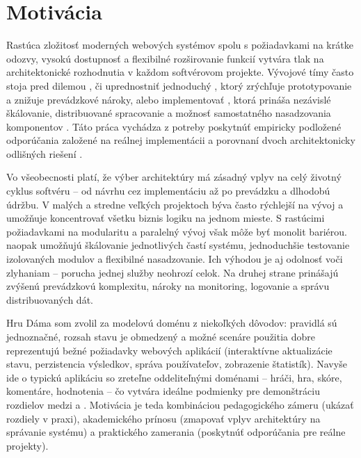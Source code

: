 \chapter{Motivácia}\label{ch:motivation}

Rastúca zložitosť moderných webových systémov spolu s požiadavkami na krátke odozvy, vysokú dostupnosť a flexibilné rozširovanie funkcií vytvára tlak na architektonické rozhodnutia v každom softvérovom projekte. Vývojové tímy často stoja pred dilemou \cite{Newman2021,Richardson2018}, či uprednostniť jednoduchý , ktorý zrýchľuje prototypovanie a znižuje prevádzkové nároky, alebo implementovať , ktorá prináša nezávislé škálovanie, distribuované spracovanie a možnosť samostatného nasadzovania komponentov \cite{FowlerMicroservices}. Táto práca vychádza z potreby poskytnúť empiricky podložené odporúčania založené na reálnej implementácii a porovnaní dvoch architektonicky odlišných riešení \cite{FowlerMonolithFirst}.

Vo všeobecnosti platí, že výber architektúry má zásadný vplyv na celý životný cyklus softvéru – od návrhu cez implementáciu až po prevádzku a dlhodobú údržbu. V malých a stredne veľkých projektoch býva  často rýchlejší na vývoj a umožňuje koncentrovať všetku biznis logiku na jednom mieste. S rastúcimi požiadavkami na modularitu a paralelný vývoj však môže byť monolit bariérou.  naopak umožňujú škálovanie jednotlivých častí systému, jednoduchšie testovanie izolovaných modulov a flexibilné nasadzovanie. Ich výhodou je aj odolnosť voči zlyhaniam – porucha jednej služby neohrozí celok. Na druhej strane prinášajú zvýšenú prevádzkovú komplexitu, nároky na monitoring, logovanie a správu distribuovaných dát.

Hru Dáma som zvolil za modelovú doménu z niekoľkých dôvodov: pravidlá sú jednoznačné, rozsah stavu je obmedzený a možné scenáre použitia dobre reprezentujú bežné požiadavky webových aplikácií (interaktívne aktualizácie stavu, perzistencia výsledkov, správa používateľov, zobrazenie štatistík). Navyše ide o typickú aplikáciu so zreteľne oddeliteľnými doménami – hráči, hra, skóre, komentáre, hodnotenia – čo vytvára ideálne podmienky pre demonštráciu rozdielov medzi  a . Motivácia je teda kombináciou pedagogického zámeru (ukázať rozdiely v praxi), akademického prínosu (zmapovať vplyv architektúry na správanie systému) a praktického zamerania (poskytnúť odporúčania pre reálne projekty).

